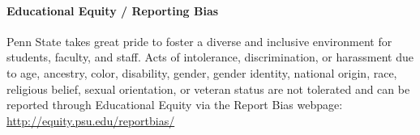 \documentclass[11pt]{article}
\begin{document}
\paragraph{Educational Equity / Reporting Bias}
Penn State takes great pride to foster a diverse and inclusive environment for students, faculty, and staff. Acts of intolerance, discrimination, or harassment due to age, ancestry, color, disability, gender, gender identity, national origin, race, religious belief, sexual orientation, or veteran status are not tolerated and can be reported through Educational Equity via the Report Bias webpage: \url{http://equity.psu.edu/reportbias/}


%
\end{document}
